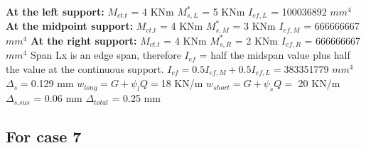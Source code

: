 \documentclass{article}%
\begin{document}
%
\newline%
\newline%
%
\textbf{At the left support:}%
\newline%
\newline%
%
$M_{ct.t}$ = 4 KNm%
\newline%
%
$M_{s,L}^{*}$ = 5 KNm%
\newline%
%
$I_{ef,L}$ = 100036892 $mm^{4}$%
\newline%
\newline%
%
\textbf{At the midpoint support:}%
\newline%
\newline%
%
$M_{ct.t}$ = 4 KNm%
\newline%
%
$M_{s,M}^{*}$ = 3 KNm%
\newline%
%
$I_{ef,M}$ = 666666667 $mm^{4}$%
\newline%
\newline%
%
\textbf{At the right support:}%
\newline%
\newline%
%
$M_{ct.t}$ = 4 KNm%
\newline%
%
$M_{s,R}^{*}$ = 2 KNm%
\newline%
%
$I_{ef,R}$ = 666666667 $mm^{4}$%
\newline%
\newline%
%
Span Lx is an edge span, therefore $I_{ef}$ = half the midspan value plus half the value at the continuous support.%
\newline%
\newline%
%
$I_{ef} = 0.5I_{ef,M} + 0.5I_{ef,L} = $383351779 $ mm^{4}$%
\newline%
\newline%
%
$\Delta_{s} =$0.129 mm%
\newline%
\newline%
%
$w_{long} = G + \psi_{l}Q = $18 KN/m%
\newline%
%
$w_{short} = G + \psi_{s}Q = $ 20 KN/m%
\newline%
\newline%
%
$\Delta_{s.sus}$ = 0.06 mm%
\newline%
\newline%
%
$\Delta_{total}$ = 0.25 mm%
\subsection*{For case 7}%
\label{subsec:Forcase7}%
\end{document}
